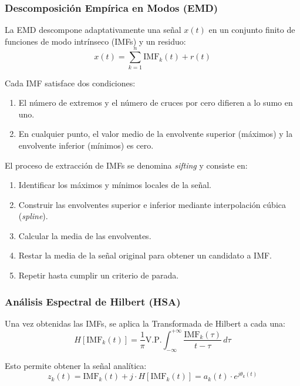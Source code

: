 \documentclass[12pt,a4paper]{article}
\begin{document}
\subsubsection{Descomposición Empírica en Modos (EMD)}

La EMD descompone adaptativamente una señal $x(t)$ en un conjunto finito de funciones de modo intrínseco (IMFs) y un residuo:
\begin{equation}
x(t) = \sum_{k=1}^{n} \text{IMF}_k(t) + r(t)
\end{equation}

Cada IMF satisface dos condiciones:
\begin{enumerate}
    \item El número de extremos y el número de cruces por cero difieren a lo sumo en uno.
    \item En cualquier punto, el valor medio de la envolvente superior (máximos) y la envolvente inferior (mínimos) es cero.
\end{enumerate}


El proceso de extracción de IMFs se denomina \textit{sifting} y consiste en:
\begin{enumerate}
    \item Identificar los máximos y mínimos locales de la señal.
    \item Construir las envolventes superior e inferior mediante interpolación cúbica (\textit{spline}).
    \item Calcular la media de las envolventes.
    \item Restar la media de la señal original para obtener un candidato a IMF.
    \item Repetir hasta cumplir un criterio de parada.
\end{enumerate}

\subsubsection{Análisis Espectral de Hilbert (HSA)}

Una vez obtenidas las IMFs, se aplica la Transformada de Hilbert a cada una:
\begin{equation}
H[\text{IMF}_k(t)] = \frac{1}{\pi} \text{V.P.} \int_{-\infty}^{+\infty} \frac{\text{IMF}_k(\tau)}{t - \tau} \, d\tau
\end{equation}

Esto permite obtener la señal analítica:
\begin{equation}
z_k(t) = \text{IMF}_k(t) + j \cdot H[\text{IMF}_k(t)] = a_k(t) \cdot e^{j\theta_k(t)}
\end{equation}
\end{document}
